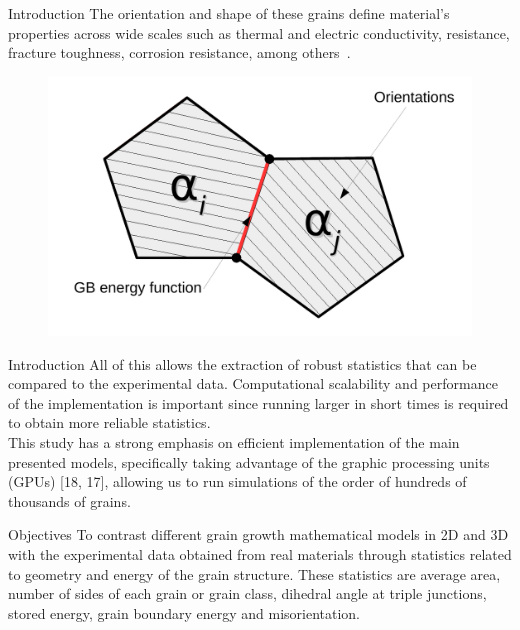 \documentclass[usenames,dvipsnames]{beamer}
\begin{document}
\begin{frame}{Introduction}
    The orientation and shape of these grains define material's properties across wide scales such as thermal and electric conductivity, resistance, fracture toughness, corrosion resistance, among others~\cite{kinderlehrermultiscale, Kinderlehrer2006, Brons2013, torres2015}.

    \begin{figure}
        \centering
        \includegraphics[scale=0.5]{figures/extras/grainenergy.pdf}
    \end{figure}
\end{frame}

\begin{frame}{Introduction}
    All of this allows the extraction of robust statistics that can be compared to the experimental data.  Computational scalability and performance of the implementation is important since running larger in short times is required to obtain more reliable statistics.\\
    
    This study has a strong emphasis on efficient implementation of the main presented models, specifically taking advantage of the graphic processing units (GPUs) [18, 17], allowing us to run simulations of the order of hundreds of thousands of grains.
\end{frame}

\begin{frame}{Objectives}
To contrast different grain growth mathematical models in 2D and 3D with the experimental data obtained from real materials through statistics related to geometry and energy of the grain structure. These statistics are average area, number of sides of each grain or grain class, dihedral angle at triple junctions, stored energy, grain boundary energy and misorientation.
\end{frame}
\end{document}

